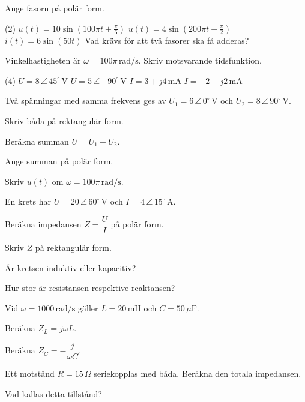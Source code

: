 Ange fasorn på polär form.
\begin{delar}(2)
  \task $u(t) = 10\sin\left(100\pi t + \frac{\pi}{6}\right)$
  \task $u(t) = 4\sin\left(200\pi t - \frac{\pi}{2}\right)$
  \task* $i(t) = 6\sin(50t)$
  \task* Vad krävs för att två fasorer ska få adderas?
\end{delar}

Vinkelhastigheten är $\omega = 100\pi\,\text{rad/s}$. Skriv motsvarande tidsfunktion.
\begin{delar}(4)
  \task $U = 8\,\angle\,45^{\circ}\,\text{V}$
  \task $U = 5\,\angle\,{-90^{\circ}}\,\text{V}$
  \task $I = 3 + j4\,\text{mA}$
  \task $I = -2 - j2\,\text{mA}$
\end{delar}

Två spänningar med samma frekvens ges av $U_1 = 6\,\angle\,0^{\circ}\,\text{V}$ och
$U_2 = 8\,\angle\,90^{\circ}\,\text{V}$.
\begin{parts}
  \item Skriv båda på rektangulär form.
  \item Beräkna summan $U = U_1 + U_2$.
  \item Ange summan på polär form.
  \item Skriv $u(t)$ om $\omega = 100\pi\,\text{rad/s}$.
\end{parts}

En krets har $U = 20\,\angle\,60^{\circ}\,\text{V}$ och $I = 4\,\angle\,15^{\circ}\,\text{A}$.
\begin{parts}
  \item Beräkna impedansen $Z = \dfrac{U}{I}$ på polär form.
  \item Skriv $Z$ på rektangulär form.
  \item Är kretsen induktiv eller kapacitiv?
  \item Hur stor är resistansen respektive reaktansen?
\end{parts}

Vid $\omega = 1000\,\text{rad/s}$ gäller $L = 20\,\text{mH}$ och $C = 50\,\mu\text{F}$.
\begin{parts}
  \item Beräkna $Z_L = j\omega L$.
  \item Beräkna $Z_C = -\dfrac{j}{\omega C}$.
  \item Ett motstånd $R = 15\,\Omega$ seriekopplas med båda. Beräkna den totala impedansen.
  \item Vad kallas detta tillstånd?
\end{parts}

